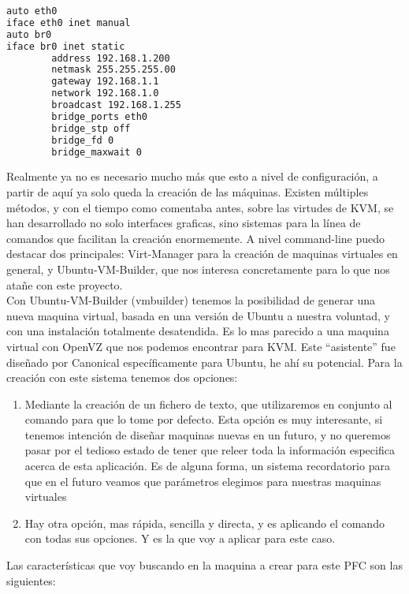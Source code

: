 \begin{lstlisting}[language=bash]
auto eth0
iface eth0 inet manual
auto br0
iface br0 inet static
        address 192.168.1.200
        netmask 255.255.255.00
        gateway 192.168.1.1
        network 192.168.1.0
        broadcast 192.168.1.255
        bridge_ports eth0
        bridge_stp off
        bridge_fd 0
        bridge_maxwait 0
\end{lstlisting}

Realmente ya no es necesario mucho más que esto a nivel de configuración, a partir de aquí ya solo queda la creación de las máquinas. Existen múltiples métodos, y con el tiempo como comentaba antes, sobre las virtudes de KVM, se han desarrollado no solo interfaces graficas, sino sistemas para la línea de comandos que facilitan la creación enormemente. A nivel command-line puedo destacar dos principales: Virt-Manager para la creación de maquinas virtuales en general, y Ubuntu-VM-Builder, que nos interesa concretamente para lo que nos atañe con este proyecto.\\

Con Ubuntu-VM-Builder (vmbuilder) tenemos la posibilidad de generar una nueva maquina virtual, basada en una versión de Ubuntu a nuestra voluntad, y con una instalación totalmente desatendida. Es lo mas parecido a una maquina virtual con OpenVZ que nos podemos encontrar para KVM. Este “asistente” fue diseñado por Canonical específicamente para Ubuntu, he ahí su potencial. Para la creación con este sistema tenemos dos opciones:

\begin{enumerate}
\item Mediante la creación de un fichero de texto, que utilizaremos en conjunto al comando para que lo tome por defecto. Esta opción es muy interesante, si tenemos intención de diseñar maquinas nuevas en un futuro, y no queremos pasar por el tedioso estado de tener que releer toda la información especifica acerca de esta aplicación. Es de alguna forma, un sistema recordatorio para que en el futuro veamos que parámetros elegimos para nuestras maquinas virtuales
\item Hay otra opción, mas rápida, sencilla y directa, y es aplicando el comando con todas sus opciones. Y es la que voy a aplicar para este caso.
\end{enumerate}

Las características que voy buscando en la maquina a crear para este PFC son las siguientes:

